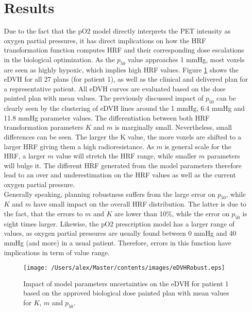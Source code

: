 \section{Results}
Due to the fact that the pO2 model directly interprets the PET intensity as oxygen partial pressures, it has direct implications on how the HRF transformation function computes HRF and their corresponding dose escalations in the biological optimization. As the $p_{50}$ value approaches 1 mmHg, most voxels are seen as highly hypoxic, which implies high HRF values. Figure \ref{fig:eDVHRobust} shows the eDVH for all 27 plans (for patient 1), as well as the clinical and delivered plan for a representative patient. All eDVH curves are evaluated based on the dose painted plan with mean values. The previously discussed impact of $p_{50}$ can be clearly seen by the clustering of eDVH lines around the 1 mmHg, 6.4 mmHg and 11.8 mmHg parameter values. The differentiation between both HRF transformation parameters $K$ and $m$ is marginally small. Nevertheless, small differences can be seen. The larger the K value, the more voxels are shifted to a larger HRF giving them a high radioresistance. As $m$ is general scale for the HRF, a larger $m$ value will stretch the HRF range, while smaller $m$ parameters will bulge it. The different HRF generated from the model parameters therefore lead to an over and underestimation on the HRF values as well as the current oxygen partial pressure.\\Generally speaking, planning robustness suffers from the large error on $p_{50}$, while $K$ and $m$ have small impact on the overall HRF distribution. The latter is due to the fact, that the errors to $m$ and $K$ are lower than 10\%, while the error on $p_{50}$ is eight times larger. Likewise, the pO2 prescription model has a larger range of values, as oxygen partial pressures are usually found between 0 mmHg and 40 mmHg (and more) in a usual patient. Therefore, errors in this function have implications in term of value range.
\begin{figure}[htb]
\centering
\texttt{[image: /Users/alex/Master/contents/images/eDVHRobust.eps]}
\vspace{1cm}
\caption{Impact of model parameters uncertainties on the eDVH for patient 1 based on the approved biological dose painted plan with mean values for $K$, $m$ and $p_{50}$.}
\label{fig:eDVHRobust}
\end{figure}
